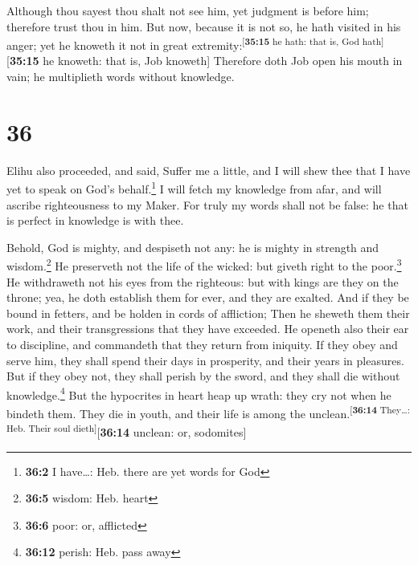  Although thou sayest thou shalt not see him, yet
judgment is before him; therefore trust thou in him.  But
now, because it is not so, he hath visited in his anger; yet he knoweth
it not in great extremity:\textsuperscript{{[}\textbf{35:15} he hath:
that is, God hath{]}}{[}\textbf{35:15} he knoweth: that is, Job
knoweth{]}  Therefore doth Job open his mouth in vain; he
multiplieth words without knowledge.

\hypertarget{section-35}{%
\section{36}\label{section-35}}

 Elihu also proceeded, and said,  Suffer me
a little, and I will shew thee that I have yet to speak on God's
behalf.\footnote{\textbf{36:2} I have\ldots: Heb. there are yet words
  for God}  I will fetch my knowledge from afar, and will
ascribe righteousness to my Maker.  For truly my words
shall not be false: he that is perfect in knowledge is with thee.

 Behold, God is mighty, and despiseth not any: he is
mighty in strength and wisdom.\footnote{\textbf{36:5} wisdom: Heb. heart}
 He preserveth not the life of the wicked: but giveth
right to the poor.\footnote{\textbf{36:6} poor: or, afflicted}
 He withdraweth not his eyes from the righteous: but with
kings are they on the throne; yea, he doth establish them for ever, and
they are exalted.  And if they be bound in fetters, and be
holden in cords of affliction;  Then he sheweth them their
work, and their transgressions that they have exceeded. 
He openeth also their ear to discipline, and commandeth that they return
from iniquity.  If they obey and serve him, they shall
spend their days in prosperity, and their years in pleasures.
 But if they obey not, they shall perish by the sword,
and they shall die without knowledge.\footnote{\textbf{36:12} perish:
  Heb. pass away}  But the hypocrites in heart heap up
wrath: they cry not when he bindeth them.  They die in
youth, and their life is among the
unclean.\textsuperscript{{[}\textbf{36:14} They\ldots: Heb. Their soul
dieth{]}}{[}\textbf{36:14} unclean: or, sodomites{]}

